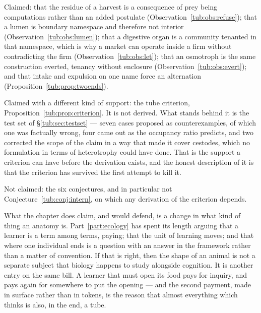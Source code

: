 Claimed: that the residue of a harvest is a consequence of prey being
computations rather than an added postulate
(Observation~\ref{tub:obs:refuse}); that a lumen is boundary namespace and
therefore not interior (Observation~\ref{tub:obs:lumen}); that a digestive organ
is a community tenanted in that namespace, which is why a market can operate
inside a firm without contradicting the firm (Observation~\ref{tub:obs:let});
that an osmotroph is the same construction everted, tenancy without enclosure
(Observation~\ref{tub:obs:evert}); and that intake and expulsion on one name
force an alternation (Proposition~\ref{tub:prop:twoends}).

Claimed with a different kind of support: the tube criterion,
Proposition~\ref{tub:prop:criterion}. It is not derived. What stands behind it is
the test set of \S\ref{tub:sec:testset} --- seven cases proposed as
counterexamples, of which one was factually wrong, four came out as the
occupancy ratio predicts, and two corrected the scope of the claim in a way that
made it cover cestodes, which no formulation in terms of heterotrophy could have
done. That is the support a criterion can have before the derivation exists, and
the honest description of it is that the criterion has survived the first attempt
to kill it.

Not claimed: the six conjectures, and in particular not
Conjecture~\ref{tub:conj:intern}, on which any derivation of the criterion
depends.

What the chapter does claim, and would defend, is a change in what kind of thing
an anatomy is. Part~\ref{part:ecology} has spent its length arguing that a
learner is a term among terms, paying; that the unit of learning moves; and that
where one individual ends is a question with an answer in the framework rather
than a matter of convention. If that is right, then the shape of an animal is not
a separate subject that biology happens to study alongside cognition. It is
another entry on the same bill. A learner that must open its food pays for
inquiry, and pays again for somewhere to put the opening --- and the second
payment, made in surface rather than in tokens, is the reason that almost
everything which thinks is also, in the end, a tube.
